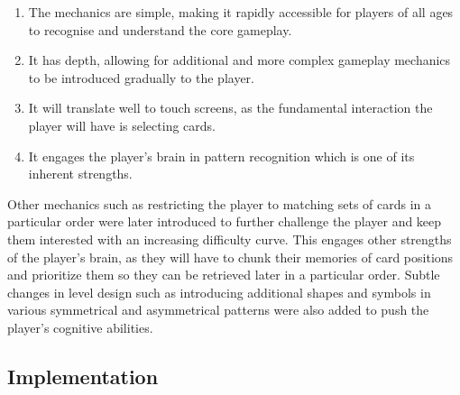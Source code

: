 \documentclass[final]{cmpreport}
\begin{document}

\begin{enumerate}
  \item The mechanics are simple, making it rapidly accessible for players of all ages to recognise and understand the core gameplay.
  \item It has depth, allowing for additional and more complex gameplay mechanics to be introduced gradually to the player.
  \item It will translate well to touch screens, as the fundamental interaction the player will have is selecting cards.
  \item It engages the player's brain in pattern recognition which is one of its inherent strengths.
\end{enumerate}

Other mechanics such as restricting the player to matching sets of cards in a particular order were later introduced to further challenge the player and keep them interested with an increasing difficulty curve. This engages other strengths of the player's brain, as they will have to chunk their memories of card positions and prioritize them so they can be retrieved later in a particular order. Subtle changes in level design such as introducing additional shapes and symbols in various symmetrical and asymmetrical patterns were also added to push the player's cognitive abilities.

\subsection{Implementation}
\end{document}
